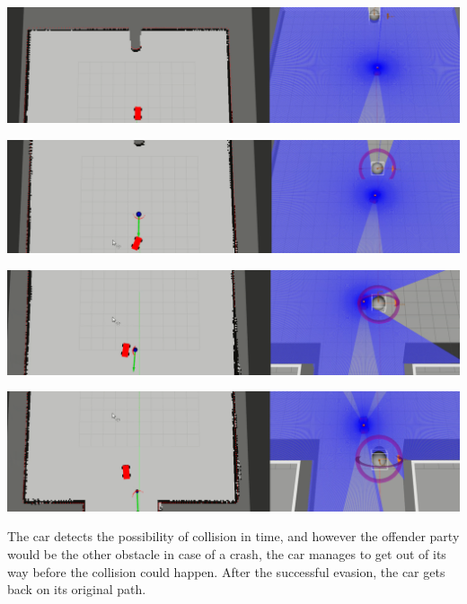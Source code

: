 \begin{minipage}{\textwidth}
    \includegraphics[width=\textwidth]{figures/raw/local_planner_test_straight_traj_faster_obj_from_behind_1.png}

    \vspace{0.5cm}
    \includegraphics[width=\textwidth]{figures/raw/local_planner_test_straight_traj_faster_obj_from_behind_2.png}

    \vspace{0.5cm}
    \includegraphics[width=\textwidth]{figures/raw/local_planner_test_straight_traj_faster_obj_from_behind_3.png}

    \vspace{0.5cm}
    \includegraphics[width=\textwidth]{figures/raw/local_planner_test_straight_traj_faster_obj_from_behind_4.png}

    \label{local_planner_test_straight_traj_faster_obj_from_behind}
\end{minipage}

The car detects the possibility of collision in time, and however the offender party would be the other obstacle in case of a crash, the car manages to get out of its way before the collision could happen. After the successful evasion, the car gets back on its original path.

